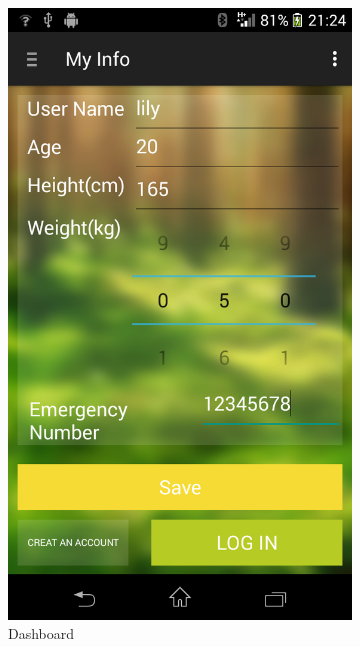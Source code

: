 \begin{figure}
\begin{subfigure}{.24\textwidth}
  \includegraphics[width=.8\linewidth]{img/screenshot/ss5.png}
  \caption{Dashboard}
\end{subfigure}%
\begin{subfigure}{.24\textwidth}
  \centering

\end{subfigure}
\end{figure}
